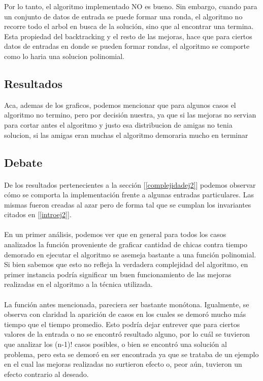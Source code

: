 Por lo tanto, el algoritmo implementado NO es bueno. Sin embargo, cuando para un conjunto de datos de entrada se puede formar una ronda, el algoritmo no recorre todo el arbol en busca de la solución, sino que al encontrar una termina. Esta propiedad del backtracking y el resto de las mejoras, hace que para ciertos datos de entradas en donde se pueden formar rondas, el algoritmo se comporte como lo haria una solucion polinomial.


\subsection{Resultados}
\label{resultadosej2}
Aca, ademas de los graficos, podemos mencionar que para algunos casos el algoritmo no termino, pero por decisión nuestra, ya que si las mejoras no servian para cortar antes el algoritmo y justo esa distribucion de amigas no tenia solucion, si las amigas eran muchas el algoritmo demoraria mucho en terminar



\subsection{Debate}
\paragraph{}
De los resultados pertenecientes a la sección [\ref{complejidadej2}] podemos observar cómo se comporta la implementación frente a algunas entradas particulares. Las mismas fueron creadas al azar pero de forma tal que se cumplan los invariantes citados en [\ref{introej2}].

\paragraph{}
En un primer análisis, podemos ver que en general para todos los casos analizados la función proveniente de graficar cantidad de chicas contra tiempo demorado en ejecutar el algoritmo se asemeja bastante a una función polinomial. Si bien sabemos que esto no refleja la verdadera complejidad del algoritmo, en primer instancia podría significar un buen funcionamiento de las mejoras realizadas en el algoritmo a la técnica utilizada.

\paragraph{}
La función antes mencionada, pareciera ser bastante monótona. Igualmente, se observa con claridad la aparición de casos en los cuales se demoró mucho más tiempo que el tiempo promedio. Esto podría dejar entrever que para ciertos valores de la entrada o no se encontró resultado alguno, por lo cuál se tuvieron que analizar los (n-1)! casos posibles, o bien se encontró una solución al problema, pero esta se demoró en ser encontrada ya que se trataba de un ejemplo en el cual las mejoras realizadas no surtieron efecto o, peor aún, tuvieron un efecto contrario al deseado.


